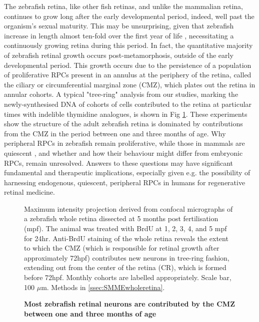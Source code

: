 The zebrafish retina, like other fish retinas, and unlike the mammalian retina, continues to grow long after the early developmental period, indeed, well past the organism's sexual maturity. This may be unsurprising, given that zebrafish increase in length almost ten-fold over the first year of life \cite{Parichy2009}, necessitating a continuously growing retina during this period. In fact, the quantitative majority of zebrafish retinal growth occurs post-metamorphosis, outside of the early developmental period. This growth occurs due to the persistence of a population of proliferative RPCs present in an annulus at the periphery of the retina, called the ciliary or circumferential marginal zone (CMZ), which plates out the retina in annular cohorts. A typical "tree-ring" analysis from our studies, marking the newly-synthesised DNA of cohorts of cells contributed to the retina at particular times with indelible thymidine analogues, is shown in Fig \ref{RingFig}. These experiments show the structure of the adult zebrafish retina is dominated by contributions from the CMZ in the period between one and three months of age. Why peripheral RPCs in zebrafish remain proliferative, while those in mammals are quiescent \cite{Tropepe2000}, and whether and how their behaviour might differ from embryonic RPCs, remain unresolved. Answers to these questions may have significant fundamental and therapeutic implications, especially given e.g. the possibility of harnessing endogenous, quiescent, peripheral RPCs in humans for regenerative retinal medicine.

\begin{figure}[!h]
\caption{{\bf Most zebrafish retinal neurons are contributed by the CMZ between one and three months of age}}
Maximum intensity projection derived from confocal micrographs of a zebrafish whole retina dissected at 5 months post fertilisation (mpf). The animal was treated with BrdU at 1, 2, 3, 4, and 5 mpf for 24hr. Anti-BrdU staining of the whole retina reveals the extent to which the CMZ (which is responsible for retinal growth after approximately 72hpf) contributes new neurons in tree-ring fashion, extending out from the center of the retina (CR), which is formed before 72hpf. Monthly cohorts are labelled appropriately. Scale bar, 100 $\mu$m.
Methods in \autoref{ssec:SMMEwholeretina}.
\label{RingFig}
\end{figure}

\FloatBarrier

